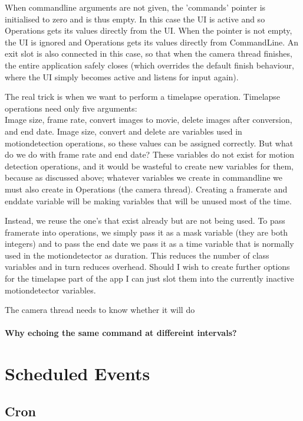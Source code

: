 \documentclass[11pt]{article} %
\begin{document}
When commandline arguments are not given, the 'commands' pointer is initialised to zero and is thus empty. In this case the UI is active and so Operations gets its values directly from the UI. When the pointer is not empty, the UI is ignored and Operations gets its values directly from CommandLine. An exit slot is also connected in this case, so that when the camera thread finishes, the entire application safely closes (which overrides the default finish behaviour, where the UI simply becomes active and listens for input again).

The real trick is when we want to perform a timelapse operation. Timelapse operations need only five arguments:
\\ Image size, frame rate, convert images to movie,  delete images after conversion, and end date.
Image size, convert and delete are variables used in motiondetection operations, so these values can be assigned correctly. But what do we do with frame rate and end date? These variables do not exist for motion detection operations, and it would be wasteful to create new variables for them, because as discussed above; whatever variables we create in commandline we must also create in Operations (the camera thread). Creating a framerate and enddate variable will be making variables that will be unused most of the time.

Instead, we reuse the one's that exist already but are not being used. To pass framerate into operations, we simply pass it as a mask variable (they are both integers) and to pass the end date we pass it as a time variable that is normally used in the motiondetector as duration. This reduces the number of class variables and in turn reduces overhead. Should I wish to create further options for the timelapse part of the app I can just slot them into the currently inactive motiondetector variables.

The camera thread needs to know whether it will do





\paragraph{Why echoing the same command at differeint intervals?}
\section{Scheduled Events}
\subsection{Cron}
\end{document}
